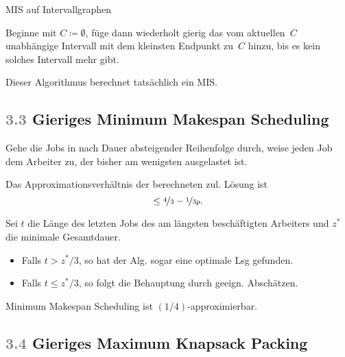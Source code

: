 \documentclass{cheat-sheet}
\newcommand{\Problem}[1]{\textcolor{ProblemColor}{\textbf{#1}}}
\newcommand{\scriptSection}[1]{\textcolor{gray}{#1}\enspace}
\begin{document}
\begin{problem}
  MIS auf Intervallgraphen
\end{problem}


\begin{alg}
  Beginne mit $C \coloneqq \emptyset$, füge dann wiederholt gierig das vom aktuellen~$C$ unabhängige Intervall mit dem kleinsten Endpunkt zu~$C$ hinzu, bis es kein solches Intervall mehr gibt.
\end{alg}

\begin{satz}
  Dieser Algorithmus berechnet tatsächlich ein MIS\@.
\end{satz}

\subsection{\scriptSection{3.3} Gieriges \Problem{Minimum Makespan Scheduling}}

\begin{alg}
  Gehe die Jobs in nach Dauer absteigender Reihenfolge durch, weise jeden Job dem Arbeiter zu, der bisher am wenigsten ausgelastet ist.
\end{alg}

\begin{satz}
  Das Approximationsverhältnis der berechneten zul. Lösung ist
  \[ \leq \nicefrac{4}{3} - \nicefrac{1}{3 p}. \]
\end{satz}

\begin{beweisskizze}
  Sei $t$ die Länge des letzten Jobs des am längsten beschäftigten Arbeiters und $z^*$ die minimale Gesamtdauer.
  \begin{itemize}
    \item Falls $t > z^*/3$, so hat der Alg. sogar eine optimale Lsg gefunden.
    \item Falls $t \leq z^*/3$, so folgt die Behauptung durch geeign. Abschätzen.
  \end{itemize}
\end{beweisskizze}

\begin{kor}
  Minimum Makespan Scheduling ist $(1/4)$-approximierbar.
\end{kor}

\subsection{\scriptSection{3.4} Gieriges \Problem{Maximum Knapsack Packing}}
\end{document}
